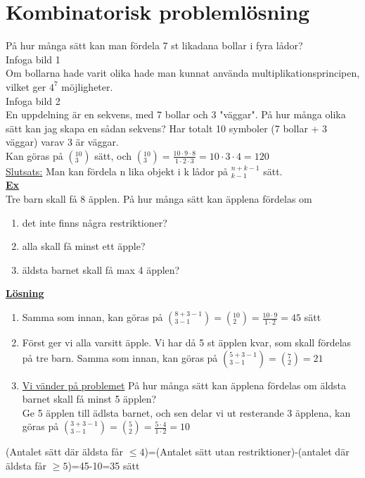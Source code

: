 \documentclass{article}
\begin{document}
    \section{Kombinatorisk problemlösning}
    På hur många sätt kan man fördela 7 st likadana bollar i fyra lådor?\\
    Infoga bild 1\\
    Om  bollarna hade varit olika hade man kunnat använda multiplikationsprincipen, vilket ger $4^{7}$ möjligheter.\\
    Infoga bild 2\\
    En uppdelning är en sekvens, med 7 bollar och 3 "väggar". 
    På hur många olika sätt kan jag skapa en sådan sekvens?
    Har totalt 10 symboler (7 bollar + 3 väggar) varav 3 är väggar.\\
    Kan göras på $(_{3}^{10})$ sätt, och $(_{3}^{10})=\frac{10\cdot 9\cdot 8}{1\cdot 2\cdot 3}=10\cdot 3\cdot 4=120$\\
    \underline{Slutsats:} Man kan fördela n lika objekt i k lådor på $^{n+k-1}_{k-1}$ sätt.\\
    \underline{\textbf{Ex}}\\
    Tre barn skall få 8 äpplen. På hur många sätt kan äpplena fördelas om 
    \begin{enumerate}
        \item det inte finns några restriktioner?
        \item alla skall få minst ett äpple?
        \item äldsta barnet skall få max 4 äpplen?
    \end{enumerate}
    \underline{\textbf{Lösning}}
    \begin{enumerate}
        \item Samma som innan, kan göras på $(_{3-1}^{8+3-1})=(_{2}^{10})=\frac{10\cdot 9}{1\cdot 2}=45$ sätt
        \item Först ger vi alla varsitt äpple. Vi har då 5 st äpplen kvar, som skall fördelas på tre barn. Samma som innan, kan göras på $(_{3-1}^{5+3-1})=(_{2}^{7})=21$
        \item \underline{Vi vänder på problemet} På hur många sätt kan äpplena fördelas om äldsta barnet skall få minst 5 äpplen?\\Ge 5 äpplen till ädlsta barnet, och sen delar vi ut resterande 3 äpplena, kan göras på $(_{3-1}^{3+3-1})=(_{2}^{5})=\frac{5\cdot 4}{1\cdot 2}=10$
    \end{enumerate}
    (Antalet sätt där äldsta får $\leq 4$)=(Antalet sätt utan restriktioner)-(antalet där äldsta får $\geq 5$)=45-10=35 sätt\\
    \clearpage
\end{document}
